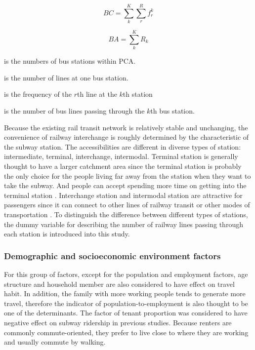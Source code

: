 \begin{equation}
BC=\sum_{k}^{K}\sum_{r}^{R}f_{r}^{k}
\label{eq:chp2:BusCapacity}
\end{equation}

\begin{equation}
BA=\sum_{k}^{K}R_{k}
\label{eq:chp2:BusAccessibility}
\end{equation}

\begin{description}
	\normalsize
	\item[\textbf{Where:}]
	\item[$K$] is the numbers of bus stations within PCA.
	\item[$R$] is the number of lines at one bus station.
	\item[$f_{r}^{k}$] is the frequency of the $r$th line at the $k$th station
	\item[$R_k$] is the number of bus lines passing through the $k$th bus station.
\end{description}

%
Because the existing rail transit network is relatively stable and unchanging, the convenience of railway interchange is roughly determined by the characteristic of the subway station. The accessibilities are different in diverse types of station: intermediate, terminal, interchange, intermodal. Terminal station is generally thought to have a larger catchment area since the terminal station is probably the only choice for the people living far away from the station when they want to take the subway. And people can accept spending more time on getting into the terminal station \cite{o1996walking}. Interchange station and intermodal station are attractive for passengers since it can connect to other lines of railway transit or other modes of transportation \cite{kuby2004factors}. To distinguish the difference between different types of stations, the dummy variable for describing the number of railway lines passing through each station is introduced into this study.

%
\subsubsection{Demographic and socioeconomic environment factors}
%
For this group of factors, except for the population and employment factors, age structure and household member are also considered to have effect on travel habit. In addition, the family with more working people tends to generate more travel, therefore the indicator of population-to-employment is also thought to be one of the determinants. The factor of tenant proportion was considered to have negative effect on subway ridership in previous studies. Because renters are commonly commute-oriented, they prefer to live close to where they are working and usually commute by walking.


